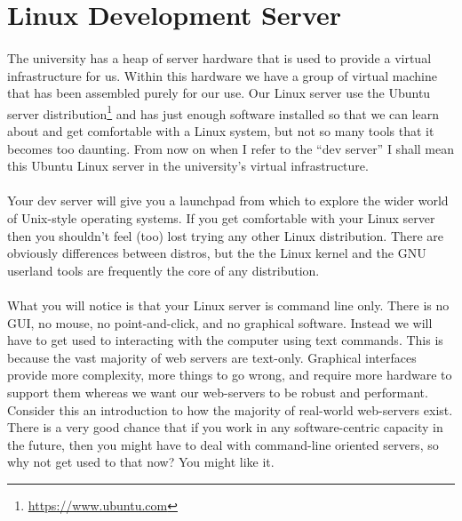 \documentclass[12pt, a4paper, oneside]{book}
\begin{document}
\section{Linux Development Server}
\label{linux}
\paragraph{} The university has a heap of server hardware that is used to provide a virtual infrastructure for us. Within this hardware we have a group of virtual machine that has been assembled purely for our use. Our Linux server use the Ubuntu server distribution\footnote{\url{https://www.ubuntu.com}} and has just enough software installed so that we can learn about and get comfortable with a Linux system, but not so many tools that it becomes too daunting. From now on when I refer to the ``dev server'' I shall mean this Ubuntu Linux server in the university's virtual infrastructure.

\paragraph{} Your dev server will give you a launchpad from which to explore the wider world of Unix-style operating systems. If you get comfortable with your Linux server then you shouldn't feel (too) lost trying any other Linux distribution. There are obviously differences between distros, but the the Linux kernel and the GNU userland tools are frequently the core of any distribution.

\paragraph{} What you will notice is that your Linux server is command line only. There is no GUI, no mouse, no point-and-click, and no graphical software. Instead we will have to get used to interacting with the computer using text commands. This is because the vast majority of web servers are text-only. Graphical interfaces provide more complexity, more things to go wrong, and require more hardware to support them whereas we want our web-servers to be robust and performant. Consider this an introduction to how the majority of real-world web-servers exist. There is a very good chance that if you work in any software-centric capacity in the future, then you might have to deal with command-line oriented servers, so why not get used to that now? You might like it.
\end{document}
